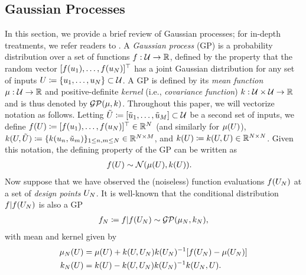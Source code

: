 \documentclass[12pt]{article}
\begin{document}
\subsection{Gaussian Processes}
In this section, we provide a brief review of Gaussian processes; for in-depth treatments, we refer readers to 
\cite{gramacy2020surrogates, StuartTeck2, gpML}. A \textit{Gaussian process} (GP) is a probability 
distribution over a set of functions $\func: \parSpace \to \R$, defined by the property that 
the random vector $[\func(\Par_1), \dots, \func(\Par_\Ndesign)]^\top$ has
a joint Gaussian distribution for any set of inputs $\parMat \Def \{\Par_1, \dots, \Par_\Ndesign\} \subset \parSpace$. 
A GP is defined by its \textit{mean function} $\gpMeanPrior: \parSpace \to \R$ and positive-definite \textit{kernel} 
(i.e., \textit{covariance function}) $\gpKerPrior: \parSpace \times \parSpace \to \R$ and is thus denoted by 
$\GP(\gpMeanPrior, \gpKerPrior)$. Throughout this paper, we will vectorize notation as follows. Letting 
$\tilde{\parMat} \Def [\tilde{\Par}_1, \dots, \tilde{\Par}_M]  \subset \parSpace$ be a second set of inputs, we define 
$\func(\parMat) \Def [\func(\Par_1), \dots, \func(\Par_\Ndesign)]^\top \in \R^{\Ndesign}$ (and similarly for $\gpMeanPrior(\parMat)$), 
$\gpKerPrior(\parMat, \tilde{\parMat}) \Def \{\gpKerPrior(\Par_{\idxDesign}, \tilde{\Par}_m)\}_{1 \leq \idxDesign, m \leq \Ndesign} \in \R^{\Ndesign \times M}$, 
and $\gpKerPrior(\parMat) \Def \gpKerPrior(\parMat, \parMat) \in \R^{\Ndesign \times \Ndesign}$. Given this notation, 
the defining property of the GP can be written as 
\begin{align}
\func(\parMat) &\sim \Gaussian(\gpMeanPrior(\parMat), \gpKerPrior(\parMat)).
\end{align}
Now suppose that we have observed the (noiseless) function evaluations $\func(\designIn)$ at a set of \textit{design points} $\designIn$. 
It is well-known \cite{gpML} that the conditional distribution $\func|\func(\designIn)$ is also a GP
\begin{align}
\funcEm[\Ndesign] \Def \func|\func(\designIn) \sim \GP(\gpMean[\Ndesign], \gpKer[\Ndesign]), \label{generic_gp_conditional}
\end{align}
with mean and kernel given by 
\begin{align}
\gpMean[\Ndesign](\parMat) &= \gpMeanPrior(\parMat) + \gpKerPrior(\parMat, \designIn) \gpKerPrior(\designIn)^{-1} [\func(\designIn) - \gpMeanPrior(\designIn)] \label{kriging_eqns} \\
\gpKer[\Ndesign](\parMat) &= \gpKerPrior(\parMat) - \gpKerPrior(\parMat, \designIn) \gpKerPrior(\designIn)^{-1} \gpKerPrior(\designIn, \parMat). \nonumber
\end{align}
\end{document}

